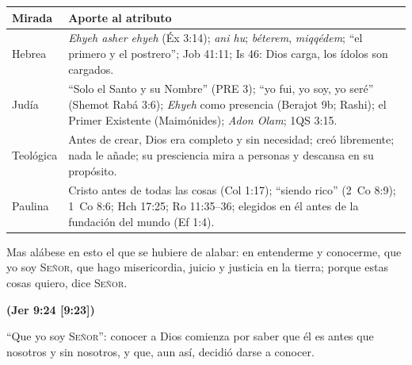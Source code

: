 \documentclass[11pt,letterpaper]{article}
\newcommand{\SENOR}{\textsc{Señor}}
\newcommand{\fuente}[1]{\par\hfill{\upshape\bfseries\small\textcolor{azul}{#1}}}
\begin{document}
\begin{center}\small\renewcommand{\arraystretch}{1.3}
\begin{tabular}{@{}L{3.0cm}L{11.4cm}@{}}
\toprule
\textbf{Mirada} & \textbf{Aporte al atributo} \\ \midrule
Hebrea & \emph{Ehyeh asher ehyeh} (Éx 3:14); \emph{ani hu}; \emph{béterem}, \emph{miqqédem}; ``el primero y el postrero''; Job 41:11; Is 46: Dios carga, los ídolos son cargados. \\
Judía & ``Solo el Santo y su Nombre'' (PRE 3); ``yo fui, yo soy, yo seré'' (Shemot Rabá 3:6); \emph{Ehyeh} como presencia (Berajot 9b; Rashi); el Primer Existente (Maimónides); \emph{Adon Olam}; 1QS 3:15. \\
Teológica & Antes de crear, Dios era completo y sin necesidad; creó libremente; nada le añade; su presciencia mira a personas y descansa en su propósito. \\
Paulina & Cristo antes de todas las cosas (Col 1:17); ``siendo rico'' (2~Co 8:9); 1~Co 8:6; Hch 17:25; Ro 11:35--36; elegidos en él antes de la fundación del mundo (Ef 1:4). \\
\bottomrule
\end{tabular}\end{center}

\begin{cita}Mas alábese en esto el que se hubiere de alabar: en entenderme y conocerme, que yo soy \SENOR{}, que hago misericordia, juicio y justicia en la tierra; porque estas cosas quiero, dice \SENOR{}.\fuente{(Jer 9:24 [9:23])}\end{cita}

``Que yo soy \SENOR'': conocer a Dios comienza por saber que él es antes que nosotros y sin nosotros, y que, aun así, decidió darse a conocer.

\end{document}
